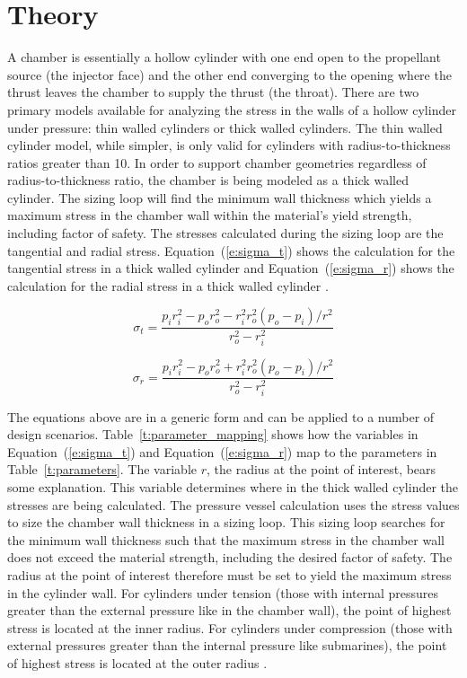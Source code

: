 \documentclass{article}
\begin{document}
\section{Theory}
A chamber is essentially a hollow cylinder with one end open to the propellant source (the injector face) and the other end converging to the opening where the thrust leaves the chamber to supply the thrust (the throat).  There are two primary models available for analyzing the stress in the walls of a hollow cylinder under pressure:  thin walled cylinders or thick walled cylinders.  The thin walled cylinder model, while simpler, is only valid for cylinders with radius-to-thickness ratios greater than 10.  In order to support chamber geometries regardless of radius-to-thickness ratio, the chamber is being modeled as a thick walled cylinder.  The sizing loop will find the minimum wall thickness which yields a maximum stress in the chamber wall within the material's yield strength, including factor of safety.  The stresses calculated during the sizing loop are the tangential and radial stress.  Equation~(\ref{e:sigma_t}) shows the calculation for the tangential stress in a thick walled cylinder and Equation~(\ref{e:sigma_r}) shows the calculation for the radial stress in a thick walled cylinder \cite{Shigley1989}. 

\begin{equation}
 \label{e:sigma_t}
  \sigma_t = \frac{p_i r_i^2 - p_o r_o^2 - r_i^2 r_o^2 (p_o - p_i)/r^2}{r_o^2 - r_i^2}
\end{equation}

\begin{equation}
 \label{e:sigma_r}
  \sigma_r = \frac{p_i r_i^2 - p_o r_o^2 + r_i^2 r_o^2 (p_o - p_i)/r^2}{r_o^2 - r_i^2}
\end{equation}

The equations above are in a generic form and can be applied to a number of design scenarios.  Table~\ref{t:parameter_mapping} shows how the variables in Equation~(\ref{e:sigma_t}) and Equation~(\ref{e:sigma_r}) map to the parameters in Table~\ref{t:parameters}.  The variable $r$, the radius at the point of interest, bears some explanation.  This variable determines where in the thick walled cylinder the stresses are being calculated.  The pressure vessel calculation uses the stress values to size the chamber wall thickness in a sizing loop.  This  sizing loop searches for the minimum wall thickness such that the maximum stress in the chamber wall does not exceed the material strength, including the desired factor of safety.  The radius at the point of interest therefore must be set to yield the maximum stress in the cylinder wall.  For cylinders under tension (those with internal pressures greater than the external pressure like in the chamber wall), the point of highest stress is located at the inner radius.  For cylinders under compression (those with external pressures greater than the internal pressure like submarines), the point of highest stress is located at the outer radius \cite{Kharagpur2015}. 
\end{document}
